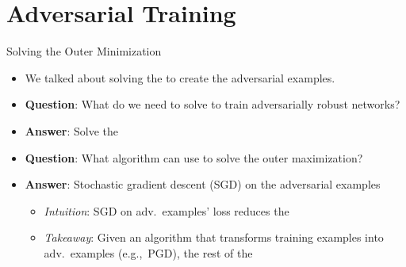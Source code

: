 \section{Adversarial Training}


\begin{frame}{Solving the Outer Minimization}

  \begin{itemize}[<+->]
    \item We talked about solving the  to create the adversarial examples.

    \vspace{13pt}
    \item \textbf{Question}: What do we need to solve to train adversarially robust networks?
    \vspace{5pt}
    \item \textbf{Answer}: Solve the 

    \vspace{13pt}
    \item \textbf{Question}: What algorithm can use to solve the outer maximization?
    \vspace{5pt}
    \item \textbf{Answer}: Stochastic gradient descent (SGD) on the adversarial examples
      \begin{itemize}[<+->]
        \setlength{\itemsep}{6pt}
        \item \textit{Intuition}: SGD on adv.\ examples' loss reduces the 
        \item \textit{Takeaway}: Given an algorithm that transforms training examples into adv.\ examples (e.g.,~PGD), the rest of the \textbf{}
      \end{itemize}
  \end{itemize}
\end{frame}


